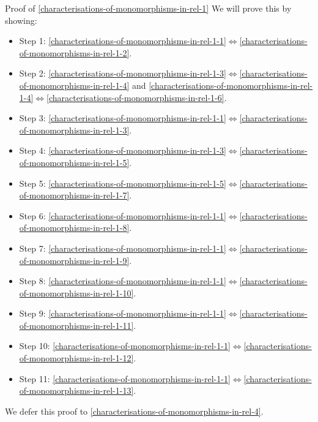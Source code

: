 \begin{Proof}{Proof of \cref{characterisations-of-monomorphisms-in-rel-1}}%
    We will prove this by showing:
    \begin{itemize}
        \item Step 1: \cref{characterisations-of-monomorphisms-in-rel-1-1}$\iff$\cref{characterisations-of-monomorphisms-in-rel-1-2}.
        \item Step 2: \cref{characterisations-of-monomorphisms-in-rel-1-3}$\iff$\cref{characterisations-of-monomorphisms-in-rel-1-4} and \cref{characterisations-of-monomorphisms-in-rel-1-4}$\iff$\cref{characterisations-of-monomorphisms-in-rel-1-6}.
        \item Step 3: \cref{characterisations-of-monomorphisms-in-rel-1-1}$\iff$\cref{characterisations-of-monomorphisms-in-rel-1-3}.
        \item Step 4: \cref{characterisations-of-monomorphisms-in-rel-1-3}$\iff$\cref{characterisations-of-monomorphisms-in-rel-1-5}.
        \item Step 5: \cref{characterisations-of-monomorphisms-in-rel-1-5}$\iff$\cref{characterisations-of-monomorphisms-in-rel-1-7}.
        \item Step 6: \cref{characterisations-of-monomorphisms-in-rel-1-1}$\iff$\cref{characterisations-of-monomorphisms-in-rel-1-8}.
        \item Step 7: \cref{characterisations-of-monomorphisms-in-rel-1-1}$\iff$\cref{characterisations-of-monomorphisms-in-rel-1-9}.
        \item Step 8: \cref{characterisations-of-monomorphisms-in-rel-1-1}$\iff$\cref{characterisations-of-monomorphisms-in-rel-1-10}.
        \item Step 9: \cref{characterisations-of-monomorphisms-in-rel-1-1}$\iff$\cref{characterisations-of-monomorphisms-in-rel-1-11}.
        \item Step 10: \cref{characterisations-of-monomorphisms-in-rel-1-1}$\iff$\cref{characterisations-of-monomorphisms-in-rel-1-12}.
        \item Step 11: \cref{characterisations-of-monomorphisms-in-rel-1-1}$\iff$\cref{characterisations-of-monomorphisms-in-rel-1-13}.
    \end{itemize}
    
    We defer this proof to \cref{characterisations-of-monomorphisms-in-rel-4}.


\end{Proof}
